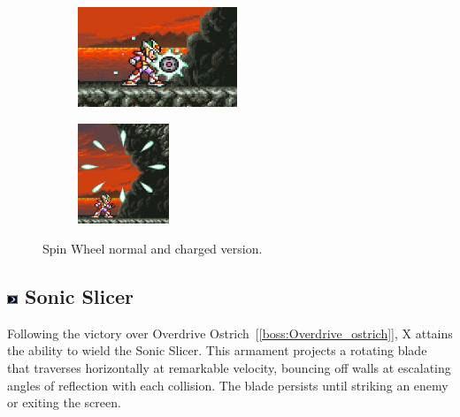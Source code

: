 \begin{figure}[htp]
	\centering
	\begin{subfigure}{0.4\linewidth}
		\centering
		\includegraphics[height=3cm]{figures/X2/weapons/S_wheel_1.png}	
	\end{subfigure}
	\begin{subfigure}{0.3\linewidth}
		\centering
		\includegraphics[height=3cm]{figures/X2/weapons/S_wheel_2.png}	
	\end{subfigure}
	\caption{Spin Wheel normal and charged version.}
\end{figure}

\subsection{\includegraphics[width=12px, height=10px]{figures/X2/weapons/S_slicer.png} Sonic Slicer}\label{Sonic_slicer}
Following the victory over Overdrive Ostrich~[\ref{boss:Overdrive_ostrich}], X attains the ability to wield the Sonic Slicer. This armament projects a rotating blade that traverses horizontally at remarkable velocity, bouncing off walls at escalating angles of reflection with each collision. The blade persists until striking an enemy or exiting the screen.

